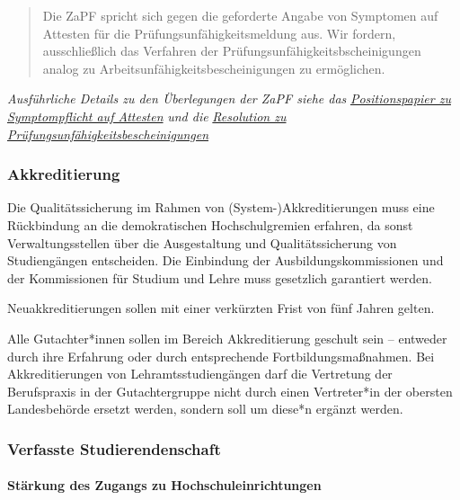 \begin{quote}
Die ZaPF spricht sich gegen die geforderte Angabe von Symptomen auf
Attesten für die Prüfungsunfähigkeitsmeldung aus. Wir fordern,
ausschließlich das Verfahren der Prüfungsunfähigkeitsbscheinigungen
analog zu Arbeitsunfähigkeitsbescheinigungen zu ermöglichen.
\end{quote}

\emph{Ausführliche Details zu den Überlegungen der ZaPF siehe das}
\href{https://zapfev.de/resolutionen/sose17/symptompflicht/PosPapier_Symptompflicht.pdf}{\emph{Positionspapier
zu Symptompflicht auf Attesten}} \emph{und die}
\href{https://zapfev.de/resolutionen/wise17/Pruefungsunfaehigkeit/Pruefungsunfaehigkeitsbescheinigung.pdf}{\emph{Resolution
zu Prüfungsunfähigkeitsbescheinigungen}}

\hypertarget{akkreditierung}{%
\subsubsection{Akkreditierung}\label{akkreditierung}}

Die Qualitätssicherung im Rahmen von (System-)Akkreditierungen muss eine
Rückbindung an die demokratischen Hochschulgremien erfahren, da sonst
Verwaltungsstellen über die Ausgestaltung und Qualitätssicherung von
Studiengängen entscheiden. Die Einbindung der Ausbildungskommissionen
und der Kommissionen für Studium und Lehre muss gesetzlich garantiert
werden.

Neuakkreditierungen sollen mit einer verkürzten Frist von fünf Jahren
gelten.

Alle Gutachter*innen sollen im Bereich Akkreditierung geschult sein --
entweder durch ihre Erfahrung oder durch entsprechende
Fortbildungsmaßnahmen. Bei Akkreditierungen von Lehramtsstudiengängen
darf die Vertretung der Berufspraxis in der Gutachtergruppe nicht durch
einen Vertreter*in der obersten Landesbehörde ersetzt werden, sondern
soll um diese*n ergänzt werden.

\hypertarget{verfasste-studierendenschaft}{%
\subsubsection{Verfasste
Studierendenschaft}\label{verfasste-studierendenschaft}}

\hypertarget{stuxe4rkung-des-zugangs-zu-hochschuleinrichtungen}{%
\paragraph{Stärkung des Zugangs zu
Hochschuleinrichtungen}\label{stuxe4rkung-des-zugangs-zu-hochschuleinrichtungen}}

